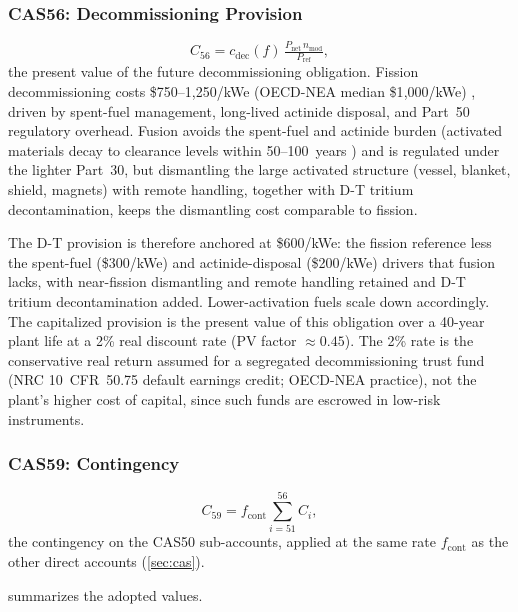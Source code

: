 \documentclass{article}
\begin{document}
\subsubsection{CAS56: Decommissioning Provision}
\begin{equation}
\label{eq:cas56}
C_{56} = c_{\text{dec}}(f)\,\tfrac{P_{\text{net}}\,n_{\text{mod}}}{P_{\text{ref}}},
\end{equation}
the present value of the future decommissioning obligation. Fission
decommissioning costs \$750--1{,}250/kWe (OECD-NEA median
\$1{,}000/kWe) \citep{oecd_nea_decom2016}, driven by spent-fuel
management, long-lived actinide disposal, and Part~50 regulatory
overhead. Fusion avoids the spent-fuel and actinide burden (activated
materials decay to clearance levels within 50--100~years
\citep{iaea_fusion_decom2020}) and is regulated under the lighter
Part~30, but dismantling the large activated structure (vessel, blanket,
shield, magnets) with remote handling, together with D-T tritium
decontamination, keeps the dismantling cost comparable to fission.

The D-T provision is therefore anchored at \$600/kWe: the fission
reference less the spent-fuel (\$300/kWe) and actinide-disposal
(\$200/kWe) drivers that fusion lacks, with near-fission dismantling and
remote handling retained and D-T tritium decontamination added.
Lower-activation fuels scale down accordingly. The capitalized provision
is the present value of this obligation over a 40-year plant life at a
2\% real discount rate (PV factor $\approx 0.45$). The 2\% rate is the
conservative real return assumed for a segregated decommissioning trust
fund (NRC 10~CFR~50.75 default earnings credit; OECD-NEA practice), not
the plant's higher cost of capital, since such funds are escrowed in
low-risk instruments.

\subsubsection{CAS59: Contingency}
\begin{equation}
\label{eq:cas59}
C_{59} = f_{\text{cont}}\sum_{i=51}^{56} C_i,
\end{equation}
the contingency on the CAS50 sub-accounts, applied at the same rate
$f_{\text{cont}}$ as the other direct accounts (\cref{sec:cas}).

 summarizes the adopted values.
\end{document}
